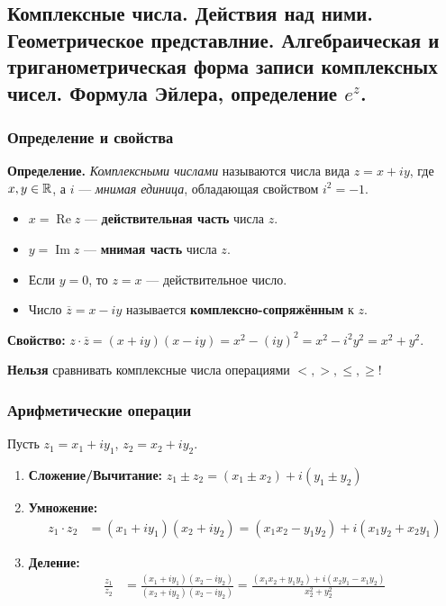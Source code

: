 \subsection{Комплексные числа. Действия над ними. Геометрическое представлние. Алгебраическая и триганометрическая форма записи комплексных чисел. Формула Эйлера, определение $e^z$.}


\subsubsection*{Определение и свойства}
\begin{tcolorbox}
\textbf{Определение.} \textit{Комплексными числами} называются числа вида $z = x + iy$, где $x, y \in \mathbb{R}$, а $i$ — \textit{мнимая единица}, обладающая свойством $i^2 = -1$.
\end{tcolorbox}
\begin{itemize}
    \item $x = \operatorname{Re } z$ — \textbf{действительная часть} числа $z$.
    \item $y = \operatorname{Im } z$ — \textbf{мнимая часть} числа $z$.
    \item Если $y = 0$, то $z = x$ — действительное число.
    \item Число $\overline{z} = x - iy$ называется \textbf{комплексно-сопряжённым} к $z$.
\end{itemize}

\begin{tcolorbox}
\textbf{Свойство:} $z \cdot \overline{z} = (x + iy)(x - iy) = x^2 - (iy)^2 = x^2 - i^2y^2 = x^2 + y^2$.
\end{tcolorbox}

\begin{tcolorbox}[title=Важное примечание]
\textbf{Нельзя} сравнивать комплексные числа операциями $<, >, \leq, \geq$!
\end{tcolorbox}

\subsubsection*{Арифметические операции}
Пусть $z_1 = x_1 + iy_1$, $z_2 = x_2 + iy_2$.
\begin{enumerate}
    \item \textbf{Сложение/Вычитание:}
    $z_1 \pm z_2 = (x_1 \pm x_2) + i(y_1 \pm y_2)$
    \item \textbf{Умножение:}
    \begin{align*}
    z_1 \cdot z_2 &= (x_1 + iy_1)(x_2 + iy_2) = (x_1x_2 - y_1y_2) + i(x_1y_2 + x_2y_1)
    \end{align*}
    \item \textbf{Деление:}
    \begin{align*}
    \frac{z_1}{z_2} &= \frac{(x_1 + iy_1)(x_2 - iy_2)}{(x_2 + iy_2)(x_2 - iy_2)} = \frac{(x_1x_2 + y_1y_2) + i(x_2y_1 - x_1y_2)}{x_2^2 + y_2^2}\\
    \end{align*}
\end{enumerate}

